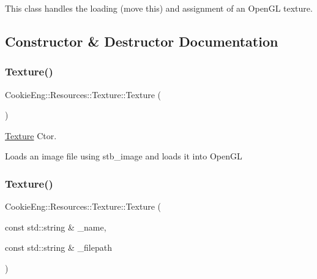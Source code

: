 This class handles the loading (move this) and assignment of an Open\+GL texture. 

\subsection{Constructor \& Destructor Documentation}
\mbox{\label{class_cookie_eng_1_1_resources_1_1_texture_ae7d09944ac0d60a971de919b2fd7108d}} 
\subsubsection{\texorpdfstring{Texture()}{Texture()}\hspace{0.1cm}{\footnotesize\ttfamily [1/2]}}
{\footnotesize\ttfamily Cookie\+Eng\+::\+Resources\+::\+Texture\+::\+Texture (\begin{DoxyParamCaption}{ }\end{DoxyParamCaption})}



\hyperlink{class_cookie_eng_1_1_resources_1_1_texture}{Texture} Ctor. 

Loads an image file using stb\+\_\+image and loads it into Open\+GL \mbox{\label{class_cookie_eng_1_1_resources_1_1_texture_a8bcbd117b436060b0540c3c80dc88b54}} 
\subsubsection{\texorpdfstring{Texture()}{Texture()}\hspace{0.1cm}{\footnotesize\ttfamily [2/2]}}
{\footnotesize\ttfamily Cookie\+Eng\+::\+Resources\+::\+Texture\+::\+Texture (\begin{DoxyParamCaption}\item[{const std\+::string \&}]{\+\_\+name,  }\item[{const std\+::string \&}]{\+\_\+filepath }\end{DoxyParamCaption})}



